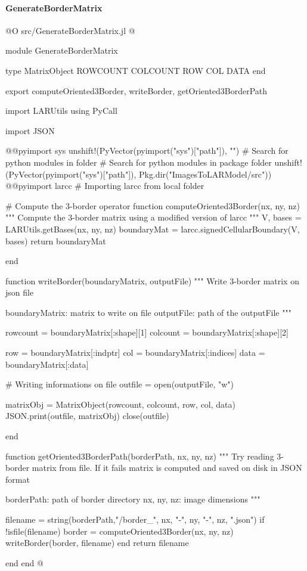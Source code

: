 \documentclass[11pt,oneside]{article}	%
\begin{document}
\paragraph{GenerateBorderMatrix}

@O src/GenerateBorderMatrix.jl
@{module GenerateBorderMatrix

type MatrixObject
  ROWCOUNT
  COLCOUNT
  ROW
  COL
  DATA
end


export computeOriented3Border, writeBorder, getOriented3BorderPath

import LARUtils
using PyCall

import JSON

@@pyimport sys
unshift!(PyVector(pyimport("sys")["path"]), "") # Search for python modules in folder
# Search for python modules in package folder
unshift!(PyVector(pyimport("sys")["path"]), Pkg.dir("ImagesToLARModel/src"))
@@pyimport larcc # Importing larcc from local folder

# Compute the 3-border operator
function computeOriented3Border(nx, ny, nz)
  """
  Compute the 3-border matrix using a modified
  version of larcc
  """
  V, bases = LARUtils.getBases(nx, ny, nz)
  boundaryMat = larcc.signedCellularBoundary(V, bases)
  return boundaryMat

end

function writeBorder(boundaryMatrix, outputFile)
  """
  Write 3-border matrix on json file

  boundaryMatrix: matrix to write on file
  outputFile: path of the outputFile
  """

  rowcount = boundaryMatrix[:shape][1]
  colcount = boundaryMatrix[:shape][2]

  row = boundaryMatrix[:indptr]
  col = boundaryMatrix[:indices]
  data = boundaryMatrix[:data]

  # Writing informations on file
  outfile = open(outputFile, "w")

  matrixObj = MatrixObject(rowcount, colcount, row, col, data)
  JSON.print(outfile, matrixObj)
  close(outfile)

end

function getOriented3BorderPath(borderPath, nx, ny, nz)
  """
  Try reading 3-border matrix from file. If it fails matrix
  is computed and saved on disk in JSON format

  borderPath: path of border directory
  nx, ny, nz: image dimensions
  """

  filename = string(borderPath,"/border_", nx, "-", ny, "-", nz, ".json")
  if !isfile(filename)
    border = computeOriented3Border(nx, ny, nz)
    writeBorder(border, filename)
  end
  return filename

end
end
@}
\end{document}
